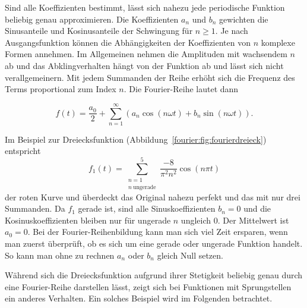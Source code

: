 Sind alle Koeffizienten bestimmt, lässt sich nahezu jede periodische Funktion beliebig genau approximieren.
Die Koeffizienten $a_n$ und $b_n$ gewichten die Sinusanteile und Kosinusanteile der Schwingung für $n \ge 1$.
Je nach Ausgangsfunktion können die Abhängigkeiten der Koeffizienten von $n$ komplexe Formen annehmen.
Im Allgemeinen nehmen die Amplituden mit wachsendem $n$ ab und das Abklingverhalten hängt von der Funktion ab und lässt sich nicht verallgemeinern.
Mit jedem Summanden der Reihe erhöht sich die Frequenz des Terms proportional zum Index $n$.
Die Fourier-Reihe lautet dann 

\begin{equation}\label{eq:fourier}
f(t) = \frac{a_0}{2} + \sum_{n=1}^{\infty} \left( a_n \cos\left( n\omega t \right) + b_n \sin\left( n \omega t \right) \right).
\end{equation}


\begin{beispiel}

Im Beispiel zur Dreiecksfunktion (Abbildung~\ref{fourier:fig:fourierdreieck}) entspricht  
%
\begin{equation}
	f_1(t) = \sum_{\substack{n=1 \\ n\ \text{ungerade}}}^{5} \frac{-8}{\pi^2 n^2} \cos(n\pi t)
\end{equation}
der roten Kurve und überdeckt das Original nahezu perfekt und das mit nur drei Summanden.  
Da $f_1$ gerade ist, sind alle Sinuskoeffizienten $b_n=0$ und die Kosinuskoeffizienten bleiben nur für ungerade $n$ ungleich $0$.  
Der Mittelwert ist $a_0=0$.  
Bei der Fourier-Reihenbildung kann man sich viel Zeit ersparen, wenn man zuerst überprüft, ob es sich um eine gerade oder ungerade Funktion handelt.
So kann man ohne zu rechnen $a_n$ oder $b_n$ gleich Null setzen.

\end{beispiel}

Während sich die Dreiecksfunktion aufgrund ihrer Stetigkeit beliebig genau durch eine Fourier-Reihe darstellen lässt, zeigt sich bei Funktionen mit Sprungstellen ein anderes Verhalten. Ein solches Beispiel wird im Folgenden betrachtet.

